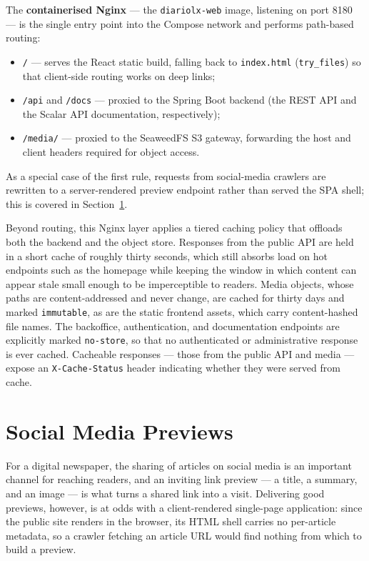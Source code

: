 The \textbf{containerised Nginx} --- the \texttt{diariolx-web} image, listening on port
8180 --- is the single entry point into the Compose network and performs path-based
routing:

\begin{itemize}
      \item \texttt{/} --- serves the React static build, falling back to
            \texttt{index.html} (\texttt{try\_files}) so that client-side routing works
            on deep links;
      \item \texttt{/api} and \texttt{/docs} --- proxied to the Spring Boot backend (the
            REST API and the Scalar API documentation, respectively);
      \item \texttt{/media/} --- proxied to the SeaweedFS S3 gateway, forwarding the
            host and client headers required for object access.
\end{itemize}

As a special case of the first rule, requests from social-media crawlers are rewritten to
a server-rendered preview endpoint rather than served the SPA shell; this is covered in
Section~\ref{sec:dep_previews}.

Beyond routing, this Nginx layer applies a tiered caching policy that offloads both the
backend and the object store. Responses from the public API are held in a short
cache of roughly thirty seconds, which still absorbs load on hot endpoints such as the
homepage while keeping the window in which content can appear stale small enough to be
imperceptible to readers. Media objects, whose paths are
content-addressed and never change, are cached for thirty days and marked
\texttt{immutable}, as are the static frontend assets, which carry content-hashed file
names. The backoffice, authentication, and documentation endpoints are explicitly marked
\texttt{no-store}, so that no authenticated or administrative response is ever cached.
Cacheable responses --- those from the public API and media --- expose an
\texttt{X-Cache-Status} header indicating whether they were served from cache.

\section{Social Media Previews} \label{sec:dep_previews}

For a digital newspaper, the sharing of articles on social media is an important channel
for reaching readers, and an inviting link preview --- a title, a summary, and an image ---
is what turns a shared link into a visit. Delivering good previews, however, is at odds
with a client-rendered single-page application: since the public site renders in the
browser, its HTML shell carries no per-article metadata, so a crawler fetching an article
URL would find nothing from which to build a preview.

